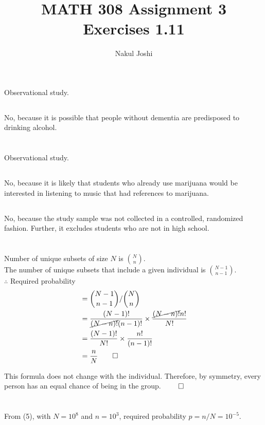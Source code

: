 \documentclass[twocolumn]{article}
\title{MATH 308 Assignment 3\\Exercises 1.11}
\author{Nakul Joshi}
\newcommand{\setsection}[1]{\setcounter{section}{#1}\addtocounter{section}{-1}\section{}}
\begin{document}
\maketitle

\setsection{2}
\subsection{} Observational study.
\subsection{} No, because it is possible that people without dementia are predisposed to drinking alcohol.

\setsection{3}
\subsection{} Observational study.
\subsection{} No, because it is likely that students who already use marijuana would be interested in listening to music that had references to marijuana.
\subsection{} No, because the study sample was not collected in a controlled, randomized fashion. Further, it excludes students who are not in high school.

\setsection{5}
Number of unique subsets of size $N$ is $\binom{N}{n}$.\\
The number of unique subsets that include a given individual is $\binom{N-1}{n-1}$.\\
$\therefore$ Required probability\begin{align*}
	&=\binom{N-1}{n-1}/\binom{N}{n}\\
	&=\frac{(N-1)!}{\cancel{(N-n)!}(n-1)!}\times\frac{\cancel{(N-n)!}n!}{N!}\\
	&=\frac{(N-1)!}{N!}\times\frac{n!}{(n-1)!}\\
	&=\frac{n}{N} \qed
\end{align*}

This formula does not change with the individual. Therefore, by symmetry, every person has an equal chance of being in the group. $\qed$

\setsection{6}
\subsection{} From (5), with $N=10^8$ and $n=10^3$, required probability $p= n/N=10^{-5}$.
\end{document}
